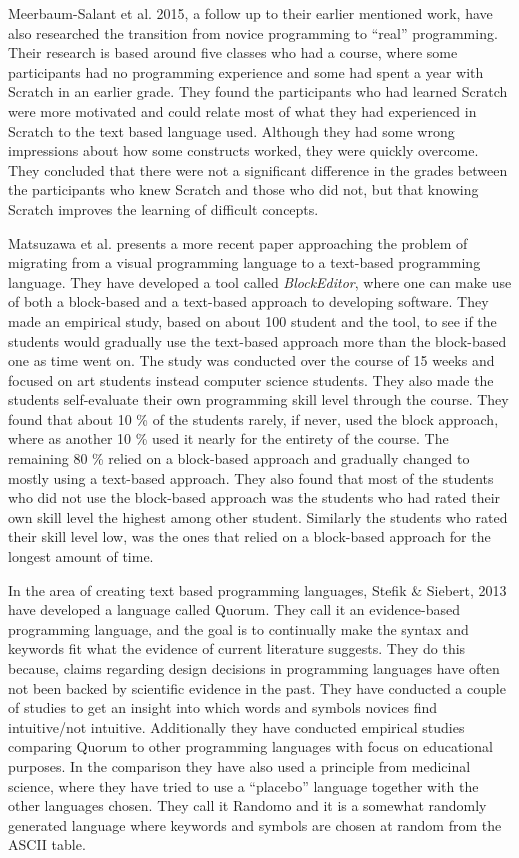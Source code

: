 Meerbaum-Salant et al. 2015\cite{from_scratch_to_real}, a follow up to their earlier mentioned work, have also researched the transition from novice programming to ``real'' programming. Their research is based around five classes who had a course, where some participants had no programming experience and some had spent a year with Scratch in an earlier grade. They found the participants who had learned Scratch were more motivated and could relate most of what they had experienced in Scratch to the text based language used. Although they had some wrong impressions about how some constructs worked, they were quickly overcome. They concluded that there were not a significant difference in the grades between the participants who knew Scratch and those who did not, but that knowing Scratch improves the learning of difficult concepts.

Matsuzawa et al. \cite{block_editor} presents a more recent paper approaching the problem of migrating from a visual programming language to a text-based programming language. They have developed a tool called \emph{BlockEditor}, where one can make use of both a block-based and a text-based approach to developing software. They made an empirical study, based on about 100 student and the tool, to see if the students would gradually use the text-based approach more than the block-based one as time went on. The study was conducted over the course of 15 weeks and focused on art students instead computer science students. They also made the students self-evaluate their own programming skill level through the course. They found that about 10 \% of the students rarely, if never, used the block approach, where as another 10 \% used it nearly for the entirety of the course. The remaining 80 \% relied on a block-based approach and gradually changed to mostly using a text-based approach. They also found that most of the students who did not use the block-based approach was the students who had rated their own skill level the highest among other student. Similarly the students who rated their skill level low, was the ones that relied on a block-based approach for the longest amount of time.

In the area of creating text based programming languages, Stefik \& Siebert, 2013\cite{stefik_all_studies} have developed a language called Quorum. They call it an evidence-based programming language, and the goal is to continually make the syntax and keywords fit what the evidence of current literature suggests. They do this because, claims regarding design decisions in programming languages have often not been backed by scientific evidence in the past\cite{ShaneMarkstrum10}. They have conducted a couple of studies to get an insight into which words and symbols novices find intuitive/not intuitive. Additionally they have conducted empirical studies comparing Quorum to other programming languages with focus on educational purposes. In the comparison they have also used a principle from medicinal science, where they have tried to use a ``placebo'' language together with the other languages chosen. They call it Randomo and it is a somewhat randomly generated language where keywords and symbols are chosen at random from the ASCII table.


